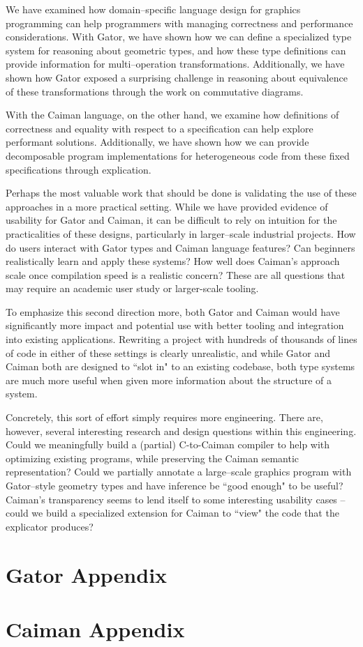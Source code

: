 \documentclass[phd,tocprelim]{cornell}
\begin{document}
We have examined how domain--specific language design for graphics programming can help programmers with managing correctness and performance considerations.  With Gator, we have shown how we can define a specialized type system for reasoning about geometric types, and how these type definitions can provide information for multi--operation transformations.  Additionally, we have shown how Gator exposed a surprising challenge in reasoning about equivalence of these transformations through the work on commutative diagrams.

With the Caiman language, on the other hand, we examine how definitions of correctness and equality with respect to a specification can help explore performant solutions.  Additionally, we have shown how we can provide decomposable program implementations for heterogeneous code from these fixed specifications through explication.

Perhaps the most valuable work that should be done is validating the use of these approaches in a more practical setting.  While we have provided evidence of usability for Gator and Caiman, it can be difficult to rely on intuition for the practicalities of these designs, particularly in larger--scale industrial projects.  How do users interact with Gator types and Caiman language features?  Can beginners realistically learn and apply these systems?  How well does Caiman's approach scale once compilation speed is a realistic concern?  These are all questions that may require an academic user study or larger-scale tooling.

To emphasize this second direction more, both Gator and Caiman would have significantly more impact and potential use with better tooling and integration into existing applications.  Rewriting a project with hundreds of thousands of lines of code in either of these settings is clearly unrealistic, and while Gator and Caiman both are designed to ``slot in" to an existing codebase, both type systems are much more useful when given more information about the structure of a system.

Concretely, this sort of effort simply requires more engineering.  There are, however, several interesting research and design questions within this engineering.  Could we meaningfully build a (partial) C-to-Caiman compiler to help with optimizing existing programs, while preserving the Caiman semantic representation?  Could we partially annotate a large--scale graphics program with Gator--style geometry types and have inference be ``good enough" to be useful?  Caiman's transparency seems to lend itself to some interesting usability cases -- could we build a specialized extension for Caiman to ``view" the code that the explicator produces?

\appendix

\chapter{Gator Appendix}


\chapter{Caiman Appendix}



\end{document}
